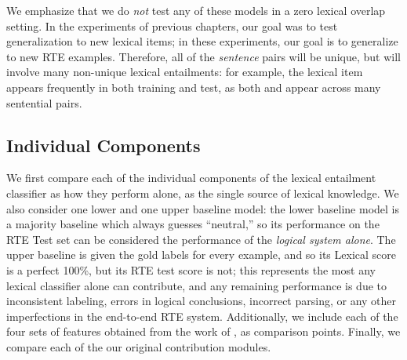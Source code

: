 We emphasize that we do {\em not} test any of these models
in a zero lexical overlap setting. In the experiments of previous chapters, our
goal was to test generalization to new lexical items; in these experiments, our
goal is to generalize to new RTE examples. Therefore, all of the {\em sentence} pairs
will be unique, but will involve many non-unique lexical entailments: for
example, the lexical item  appears frequently in
both training and test, as both  and  appear across many
sentential pairs.

\subsection{Individual Components}

We first compare each of the individual components of the lexical entailment
classifier as how they perform alone, as the single source of lexical
knowledge. We also consider one lower and one upper baseline model: the lower
baseline model is a majority baseline which always guesses ``neutral,''
so its performance on the RTE Test set can be considered the performance
of the {\em logical system alone}. The upper baseline is given the gold
labels for every example, and so its Lexical score is a perfect 100\%,
but its RTE test score is not; this represents the most any lexical classifier
alone can contribute, and any remaining performance is due to inconsistent
labeling, errors in logical conclusions, incorrect parsing, or any other
imperfections in the end-to-end RTE system.
Additionally, we include each of the four sets of features obtained from
the work of , as comparison points. Finally, we
compare each of the our original contribution modules. 

